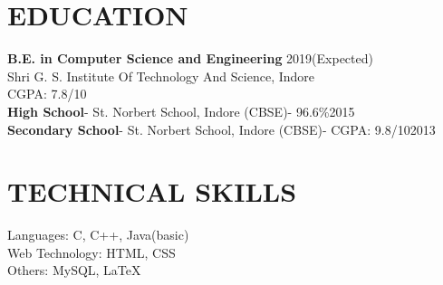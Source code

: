 \documentclass[line, margin]{res}
\begin{document}
\address{\href{mailto: sajal.agrawal1997@gmail.com}{sajal.agrawal1997@gmail.com}\\ +918878155869}
\begin{resume}

\section{EDUCATION}
\textbf{B.E. in Computer Science and Engineering} \hfill 2019(Expected)\\
Shri G. S. Institute Of Technology And Science, Indore\\
CGPA: 7.8/10\\
\textbf{High School}- St. Norbert School, Indore (CBSE)- 96.6\%\hfill 2015\\
\textbf{Secondary School}- St. Norbert School, Indore (CBSE)- CGPA: 9.8/10\hfill 2013\\

\section{TECHNICAL SKILLS}
Languages: C, C++, Java(basic)\\
Web Technology: HTML, CSS\\
Others: MySQL, \LaTeX\\


\end{resume}
\end{document}

